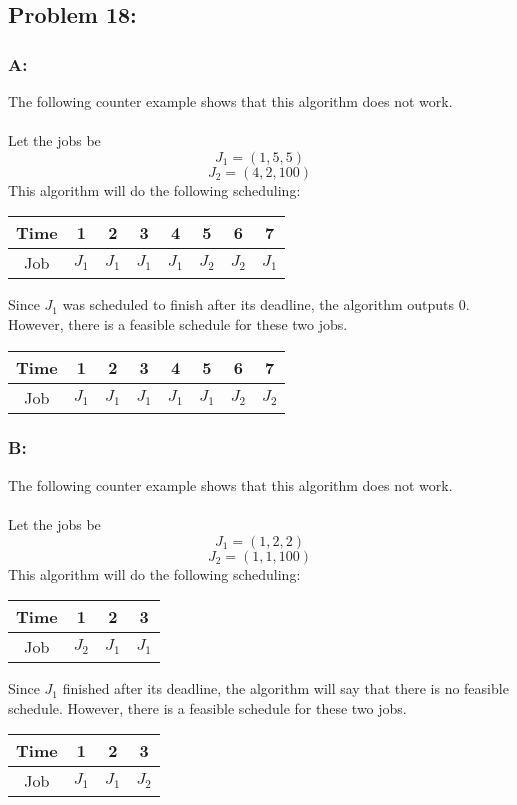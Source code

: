 \documentclass[12pt]{article}
\begin{document}
\subsection*{Problem 18:}
\subsubsection*{A:}
The following counter example shows that this algorithm does not work.\\\\
Let the jobs be
\[
J_1=(1,5,5)
\]
\[
J_2=(4,2,100)
\]
This algorithm will do the following scheduling:\\
\begin{center}
    \begin{tabular}{c|c|c|c|c|c|c|c}
    Time & 1 & 2 & 3 & 4 & 5 & 6 & 7 \\ \hline
    Job & $J_1$ & $J_1$ & $J_1$ & $J_1$ & $J_2$ & $J_2$ & $J_1$ \\
    \end{tabular}
\end{center}  
Since $J_1$ was scheduled to finish after its deadline, the algorithm
outputs $0$.  However, there is a feasible schedule for these two jobs.

\begin{center}
    \begin{tabular}{c|c|c|c|c|c|c|c}
    Time & 1 & 2 & 3 & 4 & 5 & 6 & 7 \\ \hline
    Job & $J_1$ & $J_1$ & $J_1$ & $J_1$ & $J_1$ & $J_2$ & $J_2$ \\
    \end{tabular}
\end{center}  
\subsubsection*{B:}
The following counter example shows that this algorithm does not work.\\\\
Let the jobs be
\[
J_1=(1,2,2)
\]
\[
J_2=(1,1,100)
\]
This algorithm will do the following scheduling:\\
\begin{center}
    \begin{tabular}{c|c|c|c}
    Time & 1 & 2 & 3 \\ \hline
    Job & $J_2$ & $J_1$ & $J_1$ \\
    \end{tabular}
\end{center}
Since $J_1$ finished after its deadline, the algorithm will say that
there is no feasible schedule.  However, there is a feasible schedule for these
two jobs.\\
\begin{center}
    \begin{tabular}{c|c|c|c}
    Time & 1 & 2 & 3 \\ \hline
    Job & $J_1$ & $J_1$ & $J_2$ \\
    \end{tabular}
\end{center}
\end{document}
